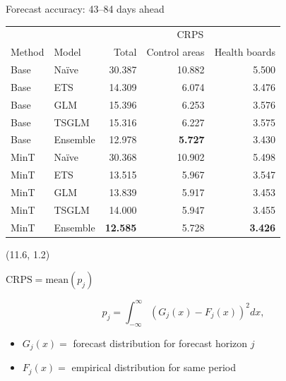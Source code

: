 \documentclass[
  14pt,
  ignorenonframetext,
  aspectratio=169,
]{beamer}
\begin{document}
\begin{frame}{Forecast accuracy: 43--84 days ahead}
\label{forecast-accuracy-4384-days-ahead-1}
\fontsize{10}{12}\sf

\begin{tabular}[t]{llrrr}
\toprule
\multicolumn{2}{c}{ } & \multicolumn{3}{c}{CRPS} \\
\cmidrule(l{3pt}r{3pt}){3-5}
Method & Model & Total & Control areas & Health boards\\
\midrule
Base & Naïve & 30.387 & 10.882 & 5.500\\
Base & ETS & 14.309 & 6.074 & 3.476\\
Base & GLM & 15.396 & 6.253 & 3.576\\
Base & TSGLM & 15.316 & 6.227 & 3.575\\
Base & Ensemble & 12.978 & \textbf{5.727} & 3.430\\
\addlinespace
MinT & Naïve & 30.368 & 10.902 & 5.498\\
MinT & ETS & 13.515 & 5.967 & 3.547\\
MinT & GLM & 13.839 & 5.917 & 3.453\\
MinT & TSGLM & 14.000 & 5.947 & 3.455\\
MinT & Ensemble & \textbf{12.585} & 5.728 & \textbf{3.426}\\
\bottomrule
\end{tabular}

\begin{textblock}{4.2}(11.6, 1.2)
\begin{block}{}
\centerline{$\text{CRPS} = \text{mean}(p_j)$}
$$
  p_j = \int_{-\infty}^{\infty} \left(G_j(x) - F_j(x)\right)^2dx,
$$
\begin{itemize}
\item $G_j(x)=$ forecast distribution for forecast horizon $j$
\item $F_j(x)=$ empirical distribution for same period
\end{itemize}
\end{block}
\end{textblock}
\end{frame}
\end{document}

